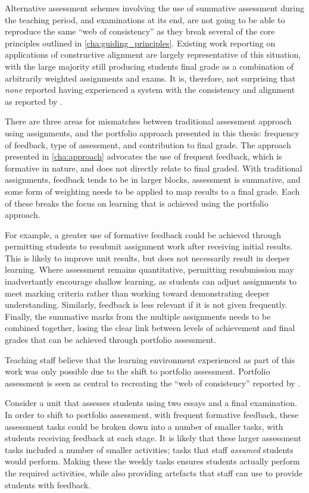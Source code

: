 Alternative assessment schemes involving the use of summative assessment during the teaching period, and examinations at its end, are not going to be able to reproduce the same ``web of consistency'' as they break several of the core principles outlined in \cref{cha:guiding_principles}. Existing work reporting on applications of constructive alignment are largely representative of this situation, with the large majority still producing students final grade as a combination of arbitrarily weighted assignments and exams. It is, therefore, not surprising that \emph{none} reported having experienced a system with the consistency and alignment as reported by \cite{Biggs:1996c}. 

There are three areas for mismatches between traditional assessment approach using assignments, and the portfolio approach presented in this thesis: frequency of feedback, type of assessment, and contribution to final grade. The approach presented in \cref{cha:approach} advocates the use of frequent feedback, which is formative in nature, and does not directly relate to final graded. With traditional assignments, feedback tends to be in larger blocks, assessment is summative, and some form of weighting needs to be applied to map results to a final grade. Each of these breaks the focus on learning that is achieved using the portfolio approach.

For example, a greater use of formative feedback could be achieved through permitting students to resubmit assignment work after receiving initial results. This is likely to improve unit results, but does not necessarily result in deeper learning. Where assessment remains quantitative, permitting resubmission may inadvertantly encourage shallow learning, as students can adjust assignments to meet marking criteria rather than working toward demonstrating deeper understanding. Similarly, feedback is less relevant if it is not given frequently. Finally, the summative marks from the multiple assignments needs to be combined together, losing the clear link between levels of achievement and final grades that can be achieved through portfolio assessment.

Teaching staff believe that the learning environment experienced as part of this work was only possible due to the shift to portfolio assessment. Portfolio assessment is seen as central to recreating the ``web of consistency'' reported by \citet{Biggs:1996c,Biggs:1999}. 

Consider a unit that assesses students using two essays and a final examination. In order to shift to portfolio assessment, with frequent formative feedback, these assessment tasks could be broken down into a number of smaller tasks, with students receiving feedback at each stage. It is likely that these larger assessment tasks included a number of smaller activities; tasks that staff \emph{assumed} students would perform. Making these the weekly tasks ensures students actually perform the required activities, while also providing artefacts that staff can use to provide students with feedback.

